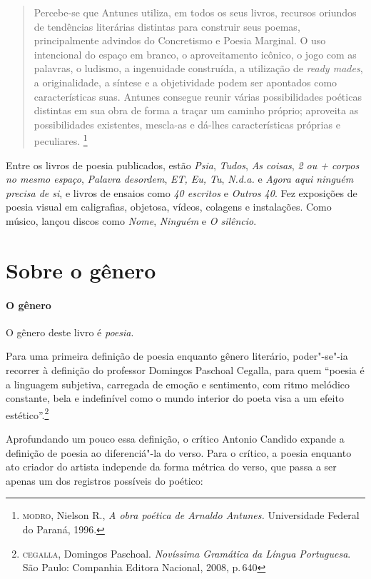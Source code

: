 \documentclass[11pt]{extarticle}
\begin{document}
\begin{quote}
Percebe-se que Antunes
utiliza, em todos os seus livros, recursos oriundos de tendências literárias distintas para
construir seus poemas, principalmente advindos do Concretismo e Poesia Marginal. O uso
intencional do espaço em branco, o aproveitamento icônico, o jogo com as palavras, o
ludismo, a ingenuidade construída, a utilização de \textit{ready mades}, a originalidade, a síntese e
a objetividade podem ser apontados como características suas. Antunes consegue reunir
várias possibilidades poéticas distintas em sua obra de forma a traçar um caminho próprio;
aproveita as possibilidades existentes, mescla-as e dá-lhes características próprias e
peculiares. \footnote{\textsc{modro}, Nielson R., \textit{A obra poética de Arnaldo Antunes.} Universidade Federal do Paraná, 1996.}
\end{quote}


Entre os livros de poesia publicados, estão \emph{Psia}, \emph{Tudos}, 
\emph{As coisas}, \emph{2 ou + corpos no mesmo espaço}, \emph{Palavra desordem}, 
\emph{ET, Eu, Tu}, \emph{N.d.a.} e \emph{Agora aqui ninguém precisa de si}, 
e livros de ensaios como \emph{40 escritos} e \emph{Outros 40}.  
Fez exposições de poesia visual em caligrafias, objetosa, vídeos, colagens e instalações. 
Como músico, lançou discos como \emph{Nome}, \emph{Ninguém} e \emph{O silêncio}.


\section{Sobre o gênero}

\paragraph{O gênero} O gênero deste livro é \textit{poesia}. 


Para uma primeira definição de poesia enquanto gênero literário, poder"-se"-ia recorrer à definição do professor Domingos Paschoal Cegalla, para quem ``poesia é a linguagem subjetiva, carregada de emoção e sentimento, com ritmo melódico constante, bela e indefinível como o mundo interior do poeta visa a um efeito estético''.\footnote{\textsc{cegalla}, Domingos Paschoal. \textit{Novíssima Gramática da Língua Portuguesa}. São Paulo: Companhia Editora Nacional, 2008, p.\,640}

Aprofundando um pouco essa definição, o crítico Antonio Candido expande a definição de poesia ao diferenciá"-la do verso.
Para o crítico, a poesia enquanto ato criador do artista independe da forma métrica do verso, que passa a ser apenas um dos registros possíveis do poético:
\end{document}
